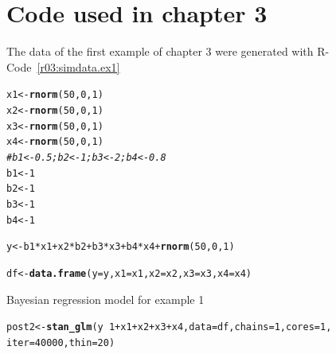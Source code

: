 \documentclass[11pt,a4paper,twoside]{book}\usepackage[]{graphicx}\usepackage[]{color}
\makeatletter
\newcommand{\hlnum}[1]{\textcolor[rgb]{0.686,0.059,0.569}{#1}}%
\newcommand{\hlcom}[1]{\textcolor[rgb]{0.678,0.584,0.686}{\textit{#1}}}%
\newcommand{\hlopt}[1]{\textcolor[rgb]{0,0,0}{#1}}%
\newcommand{\hlstd}[1]{\textcolor[rgb]{0.345,0.345,0.345}{#1}}%
\newcommand{\hlkwb}[1]{\textcolor[rgb]{0.69,0.353,0.396}{#1}}%
\newcommand{\hlkwc}[1]{\textcolor[rgb]{0.333,0.667,0.333}{#1}}%
\newcommand{\hlkwd}[1]{\textcolor[rgb]{0.737,0.353,0.396}{\textbf{#1}}}%
\newenvironment{kframe}{%
 \def\at@end@of@kframe{}%
 \ifinner\ifhmode%
  \def\at@end@of@kframe{\end{minipage}}%
  \begin{minipage}{\columnwidth}%
 \fi\fi%
 \def\FrameCommand##1{\hskip\@totalleftmargin \hskip-\fboxsep
 \colorbox{shadecolor}{##1}\hskip-\fboxsep
     \hskip-\linewidth \hskip-\@totalleftmargin \hskip\columnwidth}%
 \MakeFramed {\advance\hsize-\width
   \@totalleftmargin\z@ \linewidth\hsize
   \@setminipage}}%
 {\par\unskip\endMakeFramed%
 \at@end@of@kframe}
\newenvironment{knitrout}{}{} %
\makeatother
\begin{document}
\section{Code used in chapter 3}
The data of the first example of chapter 3 were generated with R-Code~\ref{r03:simdata.ex1}

\clearpage


\begin{codeenv}

\label{r03:simdata.ex1}

\begin{knitrout}
\color{fgcolor}\begin{kframe}
\begin{alltt}
\hlstd{x1} \hlkwb{<-} \hlkwd{rnorm}\hlstd{(}\hlnum{50}\hlstd{,} \hlnum{0}\hlstd{,} \hlnum{1}\hlstd{)}
\hlstd{x2} \hlkwb{<-} \hlkwd{rnorm}\hlstd{(}\hlnum{50}\hlstd{,} \hlnum{0}\hlstd{,} \hlnum{1}\hlstd{)}
\hlstd{x3} \hlkwb{<-} \hlkwd{rnorm}\hlstd{(}\hlnum{50}\hlstd{,} \hlnum{0}\hlstd{,} \hlnum{1}\hlstd{)}
\hlstd{x4} \hlkwb{<-} \hlkwd{rnorm}\hlstd{(}\hlnum{50}\hlstd{,} \hlnum{0}\hlstd{,} \hlnum{1}\hlstd{)}
\hlcom{# b1 <- 0.5; b2 <- 1; b3 <- 2; b4 <- 0.8}
\hlstd{b1} \hlkwb{<-} \hlnum{1}
\hlstd{b2} \hlkwb{<-} \hlnum{1}
\hlstd{b3} \hlkwb{<-} \hlnum{1}
\hlstd{b4} \hlkwb{<-} \hlnum{1}

\hlstd{y} \hlkwb{<-} \hlstd{b1} \hlopt{*} \hlstd{x1} \hlopt{+} \hlstd{x2} \hlopt{*} \hlstd{b2} \hlopt{+} \hlstd{b3} \hlopt{*} \hlstd{x3} \hlopt{+} \hlstd{b4} \hlopt{*} \hlstd{x4} \hlopt{+} \hlkwd{rnorm}\hlstd{(}\hlnum{50}\hlstd{,} \hlnum{0}\hlstd{,} \hlnum{1}\hlstd{)}

\hlstd{df} \hlkwb{<-} \hlkwd{data.frame}\hlstd{(}\hlkwc{y} \hlstd{= y,} \hlkwc{x1} \hlstd{= x1,} \hlkwc{x2} \hlstd{= x2,} \hlkwc{x3} \hlstd{= x3,} \hlkwc{x4} \hlstd{= x4)}
\end{alltt}
\end{kframe}
\end{knitrout}

\end{codeenv}

\vspace{15mm}

\begin{codeenv}
\caption{Bayesian regression model for example 1}\label{r03:model.ex1}
\begin{knitrout}
\color{fgcolor}\begin{kframe}
\begin{alltt}
\hlstd{post2} \hlkwb{<-} \hlkwd{stan_glm}\hlstd{(y} \hlopt{~} \hlnum{1} \hlopt{+} \hlstd{x1} \hlopt{+} \hlstd{x2} \hlopt{+} \hlstd{x3} \hlopt{+} \hlstd{x4,} \hlkwc{data} \hlstd{= df,} \hlkwc{chains} \hlstd{=} \hlnum{1}\hlstd{,} \hlkwc{cores} \hlstd{=} \hlnum{1}\hlstd{,}
    \hlkwc{iter} \hlstd{=} \hlnum{40000}\hlstd{,} \hlkwc{thin} \hlstd{=} \hlnum{20}\hlstd{)}
\end{alltt}
\end{kframe}
\end{knitrout}
	\end{codeenv}
\end{document}
